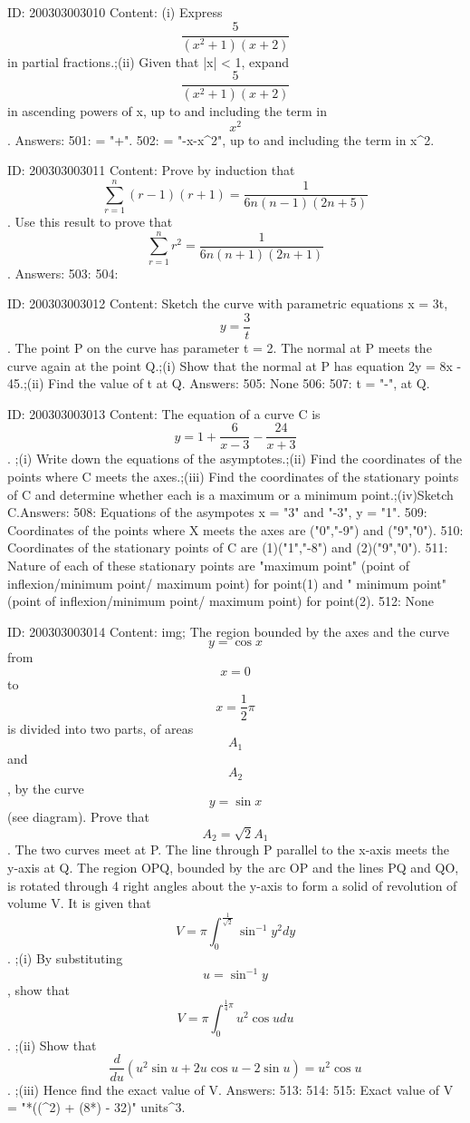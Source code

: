 \documentclass{article}
\begin{document}
ID: 200303003010
Content:
(i) Express  $$\frac{5}{( x^2  + 1 )( x + 2 )}$$ in partial fractions.;(ii) Given that |x| < 1, expand  $$\frac{5}{( x^2  + 1 )( x + 2 )}$$ in ascending powers of x, up to and including the term in  $$x^2 $$. Answers:
501:   = "+".
502:  = "-x-x^2", up to and including the term in x^2.

ID: 200303003011
Content:
Prove by induction that  $$\sum_{r = 1}^{n} ( r - 1 )( r + 1 ) = \frac{1}{6n( n - 1 )( 2n + 5 )}$$. Use this result to prove that  $$\sum_{r = 1}^{n} r^2  = \frac{1}{6n( n + 1 )( 2n + 1 )} $$. Answers:
503: 
504: 

ID: 200303003012
Content:
Sketch the curve with parametric equations x = 3t,  $$y = \frac{3}{t}$$. The point P on the curve has parameter t = 2. The normal at P meets the curve again at the point Q.;(i) Show that the normal at P has equation 2y = 8x - 45.;(ii) Find the value of t at Q. Answers:
505: None
506: 
507: t = "-", at Q.

ID: 200303003013
Content:
The equation of a curve C is \[y = 1 + \frac{6}{x - 3} - \frac{24}{x + 3}\]. ;(i) Write down the equations of the asymptotes.;(ii) Find the coordinates of the points where C meets the axes.;(iii) Find the coordinates of the stationary points of C and determine whether each is a maximum or a minimum point.;(iv)Sketch C.Answers:
508: Equations of the asympotes x = "3" and "-3", y = "1".
509: Coordinates of the points where X meets the axes are ("0","-9") and ("9","0").
510: Coordinates of the stationary points of C are (1)("1","-8") and (2)("9","0").
511: Nature of each of these stationary points are "maximum point" (point of inflexion/minimum point/ maximum point) for point(1) and " minimum point" (point of inflexion/minimum point/ maximum point) for point(2).
512: None

ID: 200303003014
Content:
img; The region bounded by the axes and the curve $$y = \cos x$$ from $$x = 0$$ to  $$x = \frac{1}{2}\pi $$ is divided into two parts, of areas  $$A_1 $$ and  $$A_2 $$, by the curve $$y = \sin x$$ (see diagram). Prove that  $$A_2  = \sqrt 2 A_1 $$. The two curves meet at P. The line through P parallel to the x-axis meets the y-axis at Q. The region OPQ, bounded by the arc OP and the lines PQ and QO, is rotated through 4 right angles about the y-axis to form a   solid of revolution of volume V. It is given that  $$V = \pi \int_0^{\frac {1}{\sqrt 2}} \sin^{-1} y^2 dy $$. ;(i) By substituting  $$u = \sin ^{-1} y$$, show that  $$V = \pi \int_0^{\frac{1}{4}\pi} u^2 \cos udu $$. ;(ii) Show that  $$\frac{d}{du} ( u^2 \sin u + 2u\cos u - 2\sin u) = u^2 \cos u$$. ;(iii) Hence find the exact value of V.  Answers:
513: 
514: 
515: Exact value of V = "*((\pi^2) + (8*\pi) - 32)" units^3.
\end{document}
